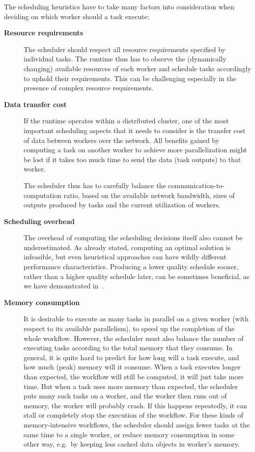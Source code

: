 The scheduling heuristics have to take many factors into consideration when deciding on which
worker should a task execute:

\begin{description}
	\item[\textbf{Resource requirements}] The scheduler should respect all resource requirements specified by individual tasks. The runtime
		thus has to observe the (dynamically changing) available resources of each worker and schedule
		tasks accordingly to uphold their requirements. This can be challenging especially in the presence
		of complex resource requirements.
	\item[\textbf{Data transfer cost}] If the runtime operates within a distributed cluster, one of the most important scheduling aspects
		that it needs to consider is the transfer cost of data between workers over the network. All
		benefits gained by computing a task on another worker to achieve more parallelization might be lost
		if it takes too much time to send the data (task outputs) to that worker.

		The scheduler thus has to carefully balance the communication-to-computation ratio, based on the
		available network bandwidth, sizes of outputs produced by tasks and the current utilization of
		workers.
	\item[\textbf{Scheduling overhead}] The overhead of computing the scheduling decisions itself also cannot be underestimated. As already
		stated, computing an optimal solution is infeasible, but even heuristical approaches can have
		wildly different performance characteristics. Producing a lower quality schedule sooner, rather
		than a higher quality schedule later, can be sometimes beneficial, as we have demonstrated
		in~\cite{estee, rsds}.
	\item[\textbf{Memory consumption}] It is desirable to execute as many tasks in parallel on a given worker (with respect to its
		available parallelism), to speed up the completion of the whole workflow. However, the scheduler
		must also balance the number of executing tasks according to the total memory that they consume. In
		general, it is quite hard to predict for how long will a task execute, and how much (peak) memory
		will it consume. When a task executes longer than expected, the workflow will still be computed, it
		will just take more time. But when a task uses more memory than expected, the scheduler puts many
		such tasks on a worker, and the worker then runs out of memory, the worker will probably crash. If
		this happens repeatedly, it can stall or completely stop the execution of the workflow. For these
		kinds of memory-intensive workflows, the scheduler should assign fewer tasks at the same time to a
		single worker, or reduce memory consumption in some other way, e.g.\ by keeping less cached data
		objects in worker's memory.
\end{description}
